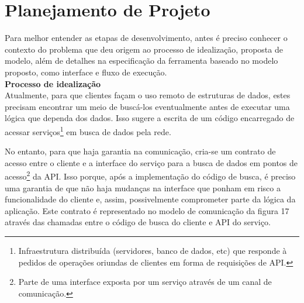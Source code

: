 \section{Planejamento de Projeto}

Para melhor entender as etapas de desenvolvimento, antes é preciso conhecer o contexto do problema que deu origem ao processo de idealização, proposta de modelo, além de detalhes na especificação da ferramenta baseado no modelo proposto, como interface e fluxo de execução. \\

\textbf{Processo de idealização} \\

Atualmente, para que clientes façam o uso remoto de estruturas de dados, estes precisam encontrar um meio de buscá-los eventualmente antes de executar uma lógica que dependa dos dados. Isso sugere a escrita de um código encarregado de acessar serviços\footnote{
  Infraestrutura distribuída (servidores, banco de dados, etc) que responde à pedidos de operações oriundas de clientes em forma de requisições de API.
} em busca de dados pela rede.

No entanto, para que haja garantia na comunicação, cria-se um contrato de acesso entre o cliente e a interface do serviço para a busca de dados em pontos de acesso\footnote{
  Parte de uma interface exposta por um serviço através de um canal de comunicação.
} da API. Isso porque, após a implementação do código de busca, é preciso uma garantia de que não haja mudanças na interface que ponham em risco a funcionalidade do cliente e, assim, possivelmente comprometer parte da lógica da aplicação. Este contrato é representado no modelo de comunicação da figura 17 através das chamadas entre o código de busca do cliente e API do serviço.

